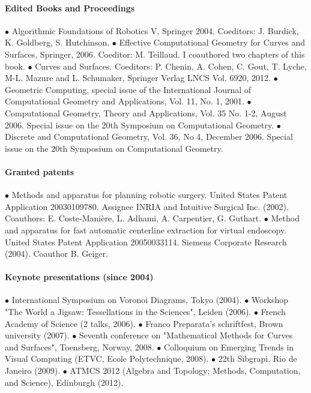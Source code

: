 

\paragraph{Edited Books and Proceedings}  \mbox{}

$\bullet$
Algorithmic Foundations of Robotics V, Springer 2004. Coeditors:  J. Burdick, 
K. Goldberg, S. Hutchinson.
$\bullet$ Effective Computational Geometry for Curves and Surfaces,
  Springer, 2006. Coeditor:  M. Teillaud. I coauthored two chapters of this book.
$\bullet$  Curves and Surfaces.
Coeditors:  P. Chenin, A. Cohen,  C. Gout, T. Lyche, M-L.  Mazure and L. Schumaker,
Springer Verlag LNCS Vol. 6920, 2012.
$\bullet$
Geometric Computing, special issue of the 
International Journal of Computational Geometry and Applications, Vol. 11, 
No. 1, 2001.
$\bullet$
Computational Geometry, Theory and Applications, Vol. 35 No. 1-2, August 2006.
Special issue on the 20th Symposium on Computational
Geometry.  %
$\bullet$ 
Discrete and Computational Geometry, Vol. 36, No 4, December 2006.
Special issue on the 20th Symposium on Computational
Geometry.  %



\paragraph{Granted patents} \mbox{}

$\bullet$  Methods and apparatus for planning robotic surgery. 
United States Patent Application 20030109780. Assignee INRIA and
Intuitive Surgical Inc. (2002).  Coauthors: E. Coste-Mani\`ere, L. Adhami,
A. Carpentier, G. Guthart.
$\bullet$  Method and apparatus for fast automatic centerline extraction for virtual 
endoscopy. United States Patent Application  20050033114. Siemens Corporate 
Research (2004). Coauthor B. Geiger.

\paragraph{Keynote presentations (since 2004)}\mbox{}

$\bullet$ International Symposium on Voronoi Diagrams, Tokyo (2004).
$\bullet$  Workshop "The World a Jigsaw: Tessellations in the Sciences", Leiden (2006).
$\bullet$  French Academy of Science (2 talks, 2006). 
$\bullet$  Franco Preparata's schriftfest, Brown university (2007). 
$\bullet$ Seventh conference on "Mathematical Methods for Curves and Surfaces", Toensberg, Norway, 2008. 
$\bullet$  Colloquium on Emerging Trends in Visual Computing (ETVC, Ecole Polytechnique, 2008). 
$\bullet$  22th Sibgrapi, Rio de Janeiro (2009).  
$\bullet$  ATMCS 2012 (Algebra and Topology; Methods, Computation, and Science), Edinburgh (2012).

